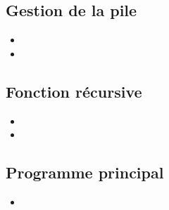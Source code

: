 \subsection{Gestion de la pile}
  \begin{itemize}
	\item {}
	\item {}
  \end{itemize}

\subsection{Fonction récursive}
  \begin{itemize}
    \item {}
    \item {}
  \end{itemize}
\subsection{Programme principal}
  \begin{itemize}
    \item {}
  \end{itemize}
